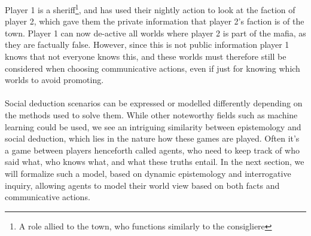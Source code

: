 Player 1 is a sheriff\footnote{A role allied to the town, who functions
	similarly to the consigliere}, and has used their nightly action to look at the
faction of player 2, which gave them the private information that player 2's
faction is of the town. Player 1 can now de-active all worlds where player 2 is
part of the mafia, as they are factually false. However, since this is not
public information player 1 knows that not everyone knows this, and these
worlds must therefore still be considered when choosing communicative actions,
even if just for knowing which worlds to avoid promoting. \\\\ Social deduction
scenarios can be expressed or modelled differently depending on the methods
used to solve them. While other noteworthy fields such as machine learning
could be used, we see an intriguing similarity between epistemology and social
deduction, which lies in the nature how these games are played. Often it's a
game between players henceforth called agents, who need to keep track of who
said what, who knows what, and what these truths entail. In the next section,
we will formalize such a model, based on dynamic epistemology and interrogative
inquiry, allowing agents to model their world view based on both facts and
communicative actions.